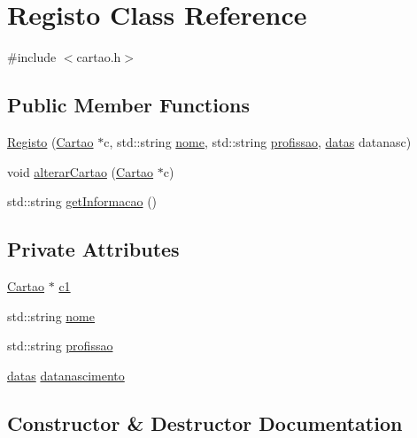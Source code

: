 \hypertarget{class_registo}{}\section{Registo Class Reference}
\label{class_registo}


{\ttfamily \#include $<$cartao.\+h$>$}

\subsection*{Public Member Functions}
\begin{DoxyCompactItemize}
\item 
\mbox{\hyperlink{class_registo_a1dca6558d473be328a35cc844dccbbc4}{Registo}} (\mbox{\hyperlink{class_cartao}{Cartao}} $\ast$c, std\+::string \mbox{\hyperlink{class_registo_a5f387f6835765cfebc7c292c8ca152dd}{nome}}, std\+::string \mbox{\hyperlink{class_registo_aff4608d0155c0e50fbe8d2db6bdc8ec2}{profissao}}, \mbox{\hyperlink{structdatas}{datas}} datanasc)
\item 
void \mbox{\hyperlink{class_registo_a3d4ce2f7e25614391d1bbe2750fafaaf}{alterar\+Cartao}} (\mbox{\hyperlink{class_cartao}{Cartao}} $\ast$c)
\item 
std\+::string \mbox{\hyperlink{class_registo_ac9b651f188464cbc0cb7846d48e2914b}{get\+Informacao}} ()
\end{DoxyCompactItemize}
\subsection*{Private Attributes}
\begin{DoxyCompactItemize}
\item 
\mbox{\hyperlink{class_cartao}{Cartao}} $\ast$ \mbox{\hyperlink{class_registo_a081486fcc65a8696797eae018b89ab59}{c1}}
\item 
std\+::string \mbox{\hyperlink{class_registo_a5f387f6835765cfebc7c292c8ca152dd}{nome}}
\item 
std\+::string \mbox{\hyperlink{class_registo_aff4608d0155c0e50fbe8d2db6bdc8ec2}{profissao}}
\item 
\mbox{\hyperlink{structdatas}{datas}} \mbox{\hyperlink{class_registo_ab95310053ffb7e2a07e45de4b3e8d62f}{datanascimento}}
\end{DoxyCompactItemize}


\subsection{Constructor \& Destructor Documentation}
\mbox{\label{class_registo_a1dca6558d473be328a35cc844dccbbc4}} 
